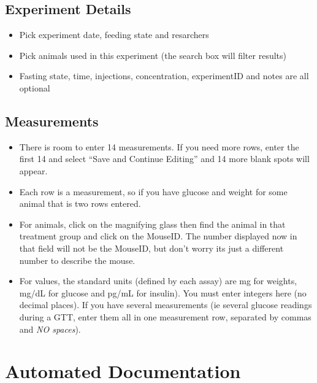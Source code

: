 \documentclass[letterpaper,10pt,english]{sphinxmanual}
\begin{document}
\section{Experiment Details}
\label{usage:experiment-details}\begin{itemize}
\item {} 
Pick experiment date, feeding state and resarchers

\item {} 
Pick animals used in this experiment (the search box will filter results)

\item {} 
Fasting state, time, injections, concentration, experimentID and notes are all optional

\end{itemize}


\section{Measurements}
\label{usage:measurements}\begin{itemize}
\item {} 
There is room to enter 14 measurements.  If you need more rows, enter the first 14 and select ``Save and Continue Editing'' and 14 more blank spots will appear.

\item {} 
Each row is a measurement, so if you have glucose and weight for some animal that is two rows entered.

\item {} 
For animals, click on the magnifying glass then find the animal in that treatment group and click on the MouseID. The number displayed now in that field will not be the MouseID, but don't worry its just a different number to describe the mouse.

\item {} 
For values, the standard units (defined by each assay) are mg for weights, mg/dL for glucose and pg/mL for insulin).  You must enter integers here (no decimal places).  If you have several measurements (ie several glucose readings during a GTT, enter them all in one measurement row, separated by commas and \emph{NO spaces}).

\end{itemize}


\chapter{Automated Documentation}
\label{api:automated-documentation}\label{api::doc}
\end{document}
